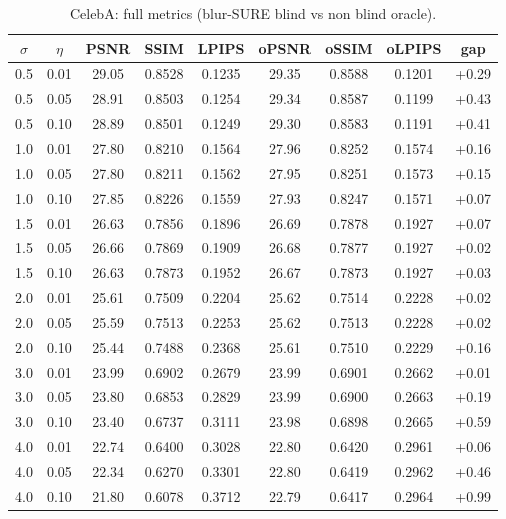 \begin{table}[h]
\centering
\small
\begin{tabular}{ccccccccc}
\toprule
$\sigma$ & $\eta$ & PSNR & SSIM & LPIPS & oPSNR & oSSIM & oLPIPS & gap \\
\midrule
0.5 & 0.01 & 29.05 & 0.8528 & 0.1235 & 29.35 & 0.8588 & 0.1201 & +0.29 \\
0.5 & 0.05 & 28.91 & 0.8503 & 0.1254 & 29.34 & 0.8587 & 0.1199 & +0.43 \\
0.5 & 0.10 & 28.89 & 0.8501 & 0.1249 & 29.30 & 0.8583 & 0.1191 & +0.41 \\
1.0 & 0.01 & 27.80 & 0.8210 & 0.1564 & 27.96 & 0.8252 & 0.1574 & +0.16 \\
1.0 & 0.05 & 27.80 & 0.8211 & 0.1562 & 27.95 & 0.8251 & 0.1573 & +0.15 \\
1.0 & 0.10 & 27.85 & 0.8226 & 0.1559 & 27.93 & 0.8247 & 0.1571 & +0.07 \\
1.5 & 0.01 & 26.63 & 0.7856 & 0.1896 & 26.69 & 0.7878 & 0.1927 & +0.07 \\
1.5 & 0.05 & 26.66 & 0.7869 & 0.1909 & 26.68 & 0.7877 & 0.1927 & +0.02 \\
1.5 & 0.10 & 26.63 & 0.7873 & 0.1952 & 26.67 & 0.7873 & 0.1927 & +0.03 \\
2.0 & 0.01 & 25.61 & 0.7509 & 0.2204 & 25.62 & 0.7514 & 0.2228 & +0.02 \\
2.0 & 0.05 & 25.59 & 0.7513 & 0.2253 & 25.62 & 0.7513 & 0.2228 & +0.02 \\
2.0 & 0.10 & 25.44 & 0.7488 & 0.2368 & 25.61 & 0.7510 & 0.2229 & +0.16 \\
3.0 & 0.01 & 23.99 & 0.6902 & 0.2679 & 23.99 & 0.6901 & 0.2662 & +0.01 \\
3.0 & 0.05 & 23.80 & 0.6853 & 0.2829 & 23.99 & 0.6900 & 0.2663 & +0.19 \\
3.0 & 0.10 & 23.40 & 0.6737 & 0.3111 & 23.98 & 0.6898 & 0.2665 & +0.59 \\
4.0 & 0.01 & 22.74 & 0.6400 & 0.3028 & 22.80 & 0.6420 & 0.2961 & +0.06 \\
4.0 & 0.05 & 22.34 & 0.6270 & 0.3301 & 22.80 & 0.6419 & 0.2962 & +0.46 \\
4.0 & 0.10 & 21.80 & 0.6078 & 0.3712 & 22.79 & 0.6417 & 0.2964 & +0.99 \\
\bottomrule
\end{tabular}
\caption{CelebA: full metrics (blur-SURE blind vs non blind oracle).}
\label{tab:full_metrics_celeba}
\end{table}
